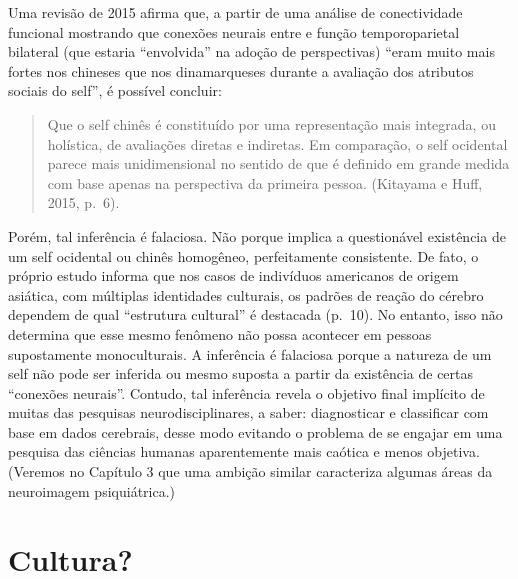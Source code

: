 Uma revisão de 2015 afirma que, a partir de uma análise de conectividade
funcional mostrando que conexões neurais entre  e função
temporoparietal bilateral (que estaria ``envolvida'' na adoção de
perspectivas) ``eram muito mais fortes nos chineses que nos
dinamarqueses durante a avaliação dos atributos sociais do self'', é
possível concluir:

\begin{quote}
Que o self chinês é constituído por uma representação mais integrada, ou
holística, de avaliações diretas e indiretas. Em comparação, o self
ocidental parece mais unidimensional no sentido de que é definido em
grande medida com base apenas na perspectiva da primeira pessoa.
(Kitayama e Huff, 2015, p.~6).
\end{quote}

Porém, tal inferência é falaciosa. Não porque implica a questionável
existência de um self ocidental ou chinês homogêneo, perfeitamente
consistente. De fato, o próprio estudo informa que nos casos de
indivíduos americanos de origem asiática, com múltiplas identidades
culturais, os padrões de reação do cérebro dependem de qual ``estrutura
cultural'' é destacada (p.~10). No entanto, isso não determina que esse
mesmo fenômeno não possa acontecer em pessoas supostamente
monoculturais. A inferência é falaciosa porque a natureza de um self não
pode ser inferida ou mesmo suposta a partir da existência de certas
``conexões neurais''. Contudo, tal inferência revela o objetivo final
implícito de muitas das pesquisas neurodisciplinares, a saber:
diagnosticar e classificar com base em dados cerebrais, desse modo
evitando o problema de se engajar em uma pesquisa das ciências humanas
aparentemente mais caótica e menos objetiva. (Veremos no Capítulo 3 que
uma ambição similar caracteriza algumas áreas da neuroimagem
psiquiátrica.)

\section{Cultura?}

